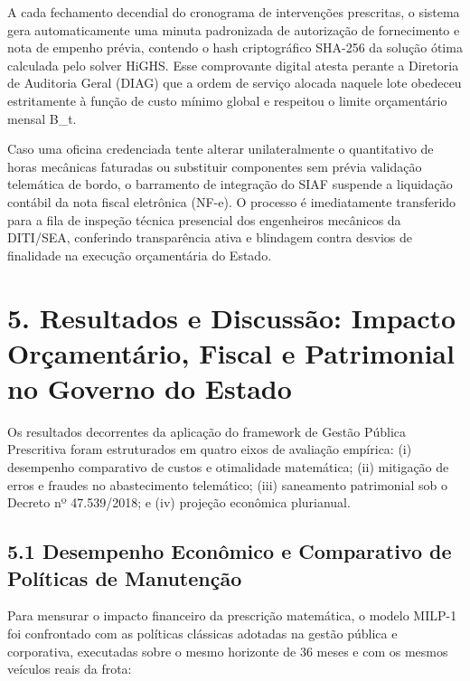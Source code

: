 \documentclass[10pt,a4paper,journal]{article}
\begin{document}
A cada fechamento decendial do cronograma de intervenções prescritas, o sistema gera automaticamente uma minuta padronizada de autorização de fornecimento e nota de empenho prévia, contendo o hash criptográfico SHA-256 da solução ótima calculada pelo solver HiGHS. Esse comprovante digital atesta perante a Diretoria de Auditoria Geral (DIAG) que a ordem de serviço alocada naquele lote obedeceu estritamente à função de custo mínimo global e respeitou o limite orçamentário mensal B\_t.

Caso uma oficina credenciada tente alterar unilateralmente o quantitativo de horas mecânicas faturadas ou substituir componentes sem prévia validação telemática de bordo, o barramento de integração do SIAF suspende a liquidação contábil da nota fiscal eletrônica (NF-e). O processo é imediatamente transferido para a fila de inspeção técnica presencial dos engenheiros mecânicos da DITI/SEA, conferindo transparência ativa e blindagem contra desvios de finalidade na execução orçamentária do Estado.

\section{5. Resultados e Discussão: Impacto Orçamentário, Fiscal e Patrimonial no Governo do Estado}
Os resultados decorrentes da aplicação do framework de Gestão Pública Prescritiva foram estruturados em quatro eixos de avaliação empírica: (i) desempenho comparativo de custos e otimalidade matemática; (ii) mitigação de erros e fraudes no abastecimento telemático; (iii) saneamento patrimonial sob o Decreto nº 47.539/2018; e (iv) projeção econômica plurianual.

\subsection{5.1 Desempenho Econômico e Comparativo de Políticas de Manutenção}
Para mensurar o impacto financeiro da prescrição matemática, o modelo MILP-1 foi confrontado com as políticas clássicas adotadas na gestão pública e corporativa, executadas sobre o mesmo horizonte de 36 meses e com os mesmos veículos reais da frota:
\end{document}
